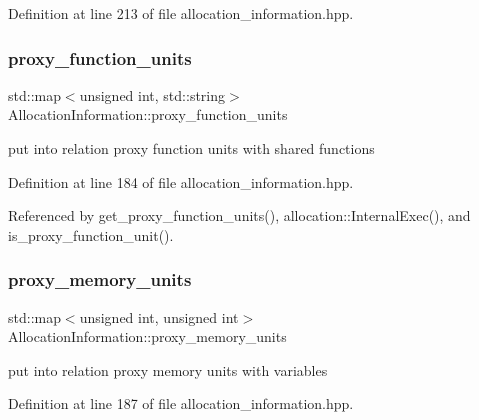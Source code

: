 Definition at line 213 of file allocation\+\_\+information.\+hpp.

\mbox{\label{classAllocationInformation_a4243b840b6c6b552518720eab142d881}} 
\subsubsection{\texorpdfstring{proxy\+\_\+function\+\_\+units}{proxy\_function\_units}}
{\footnotesize\ttfamily std\+::map$<$unsigned int, std\+::string$>$ Allocation\+Information\+::proxy\+\_\+function\+\_\+units\hspace{0.3cm}{\ttfamily [private]}}



put into relation proxy function units with shared functions 



Definition at line 184 of file allocation\+\_\+information.\+hpp.



Referenced by get\+\_\+proxy\+\_\+function\+\_\+units(), allocation\+::\+Internal\+Exec(), and is\+\_\+proxy\+\_\+function\+\_\+unit().

\mbox{\label{classAllocationInformation_af14479ed900999853f11bf37bece6c74}} 
\subsubsection{\texorpdfstring{proxy\+\_\+memory\+\_\+units}{proxy\_memory\_units}}
{\footnotesize\ttfamily std\+::map$<$unsigned int, unsigned int$>$ Allocation\+Information\+::proxy\+\_\+memory\+\_\+units\hspace{0.3cm}{\ttfamily [private]}}



put into relation proxy memory units with variables 



Definition at line 187 of file allocation\+\_\+information.\+hpp.



